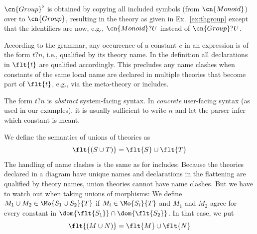 \begin{example}
$\cn{Group}^\flat$ is obtained by copying all included symbols (from $\cn{Monoid}$) over to $\cn{Group}$, resulting in the theory as given in Ex.~\ref{ex:thgroup} except that the identifiers are now, e.g., $\cn{Monoid}?U$ instead of $\cn{Group}?U$.
\end{example}

\begin{remark}
According to the grammar, any occurrence of a constant $c$ in an expression is of the form $t?n$, i.e., qualified by its theory name.
In the definition all declarations in $\flt{t}$ are qualified accordingly.
This precludes any name clashes when constants of the same local name are declared in multiple theories that become part of $\flt{t}$, e.g., via the meta-theory or includes.

The form $t?n$ is \emph{abstract} system-facing syntax.
In \emph{concrete} user-facing syntax (as used in our examples), it is usually sufficient to write $n$ and let the \mmt parser infer which constant is meant.
\end{remark}

\begin{example}\label{sem:union}
We define the semantics of unions of theories as
\[\flt{(S\cup T)}=\flt{S}\cup\flt{T}\]
The handling of name clashes is the same as for includes:
Because the theories declared in a diagram have unique names and declarations in the flattening are qualified by theory names, union theories cannot have name clashes.
But we have to watch out when taking unions of morphisms:
We define $M_1\cup M_2\in \Mo{S_1\cup S_2}{T}$ if $M_i\in\Mo{S_i}{T}$ and $M_1$ and $M_2$ agree for every constant in $\dom{\flt{S_1}}\cap\dom{\flt{S_2}}$.
In that case, we put
\[\flt{(M\cup N)}=\flt{M}\cup\flt{N}\]
\end{example}



